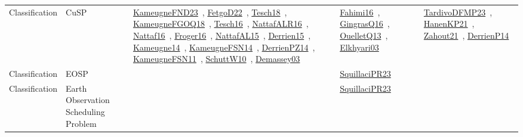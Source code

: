 {\begin{longtable}{lp{3cm}>{\raggedright\arraybackslash}p{6cm}>{\raggedright\arraybackslash}p{6cm}>{\raggedright\arraybackslash}p{8cm}}
Classification & CuSP & \href{../works/KameugneFND23.pdf}{KameugneFND23}~\cite{KameugneFND23}, \href{../works/FetgoD22.pdf}{FetgoD22}~\cite{FetgoD22}, \href{../works/Tesch18.pdf}{Tesch18}~\cite{Tesch18}, \href{../works/KameugneFGOQ18.pdf}{KameugneFGOQ18}~\cite{KameugneFGOQ18}, \href{../works/Tesch16.pdf}{Tesch16}~\cite{Tesch16}, \href{../works/NattafALR16.pdf}{NattafALR16}~\cite{NattafALR16}, \href{../works/Nattaf16.pdf}{Nattaf16}~\cite{Nattaf16}, \href{../works/Froger16.pdf}{Froger16}~\cite{Froger16}, \href{../works/NattafAL15.pdf}{NattafAL15}~\cite{NattafAL15}, \href{../works/Derrien15.pdf}{Derrien15}~\cite{Derrien15}, \href{../works/Kameugne14.pdf}{Kameugne14}~\cite{Kameugne14}, \href{../works/KameugneFSN14.pdf}{KameugneFSN14}~\cite{KameugneFSN14}, \href{../works/DerrienPZ14.pdf}{DerrienPZ14}~\cite{DerrienPZ14}, \href{../works/KameugneFSN11.pdf}{KameugneFSN11}~\cite{KameugneFSN11}, \href{../works/SchuttW10.pdf}{SchuttW10}~\cite{SchuttW10}, \href{../works/Demassey03.pdf}{Demassey03}~\cite{Demassey03} & \href{../works/Fahimi16.pdf}{Fahimi16}~\cite{Fahimi16}, \href{../works/GingrasQ16.pdf}{GingrasQ16}~\cite{GingrasQ16}, \href{../works/OuelletQ13.pdf}{OuelletQ13}~\cite{OuelletQ13}, \href{../works/Elkhyari03.pdf}{Elkhyari03}~\cite{Elkhyari03} & \href{../works/TardivoDFMP23.pdf}{TardivoDFMP23}~\cite{TardivoDFMP23}, \href{../works/HanenKP21.pdf}{HanenKP21}~\cite{HanenKP21}, \href{../works/Zahout21.pdf}{Zahout21}~\cite{Zahout21}, \href{../works/DerrienP14.pdf}{DerrienP14}~\cite{DerrienP14}\\
Classification & EOSP &  & \href{../works/SquillaciPR23.pdf}{SquillaciPR23}~\cite{SquillaciPR23} & \\
Classification & Earth Observation Scheduling Problem &  & \href{../works/SquillaciPR23.pdf}{SquillaciPR23}~\cite{SquillaciPR23} & \\

\end{longtable}}
